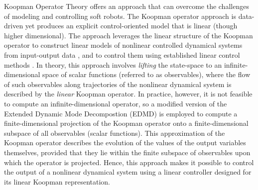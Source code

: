 
Koopman Operator Theory offers an approach that can overcome the challenges of modeling and controlling soft robots.
The Koopman operator approach is data-driven yet produces an explicit control-oriented model that is linear (though higher dimensional).
The approach leverages the linear structure of the Koopman operator to construct linear models of nonlinear controlled dynamical systems from input-output data \cite{bruder2018nonlinear, mauroy2016linear}, and to control them using established linear control methods \cite{Abraham-RSS-17, korda2018linear}.
In theory, this approach involves \emph{lifting} the state-space to an infinite-dimensional space of scalar functions (referred to as observables), where the flow of such observables along trajectories of the nonlinear dynamical system is described by the \emph{linear} Koopman operator.
In practice, however, it is not feasible to compute an infinite-dimensional operator, so a modified version of the Extended Dynamic Mode Decompostion (EDMD) is employed to compute a finite-dimensional projection of the Koopman operator onto a finite-dimensional subspace of all observables (scalar functions).
This approximation of the Koopman operator describes the evolution of the values of the output variables themselves, provided that they lie within the finite subspace of observables upon which the operator is projected.
Hence, this approach makes it possible to control the output of a nonlinear dynamical system using a linear controller designed for its linear Koopman representation.

